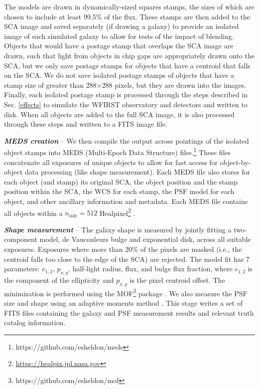\documentclass[aps,prd, amsmath,amssymb,superscriptaddress,showkeys,nofootinbib,reprint,preprintnumbers]{revtex4-1}
\begin{document}
The models are drawn in dynamically-sized squares stamps, the sizes of which are chosen to include at least 99.5\% of the flux.
These stamps are then added to the SCA image and saved separately (if drawing a galaxy) to provide an isolated image of each simulated galaxy to allow for tests of the impact of blending.
Objects that would have a postage stamp that overlaps the SCA image are drawn, such that light from objects in chip gaps are appropriately drawn onto the SCA, but we only save postage stamps for objects that have a centroid that falls on the SCA. 
We do not save isolated postage stamps of objects that have a stamp size of greater than 288$\times$288 pixels, but they are drawn into the images.
Finally, each isolated postage stamp is processed through the steps described in Sec. \ref{effects} to simulate the WFIRST observatory and detectors and written to disk. When all objects are added to the full SCA image, it is also processed through these steps and written to a FITS image file.

\textbf{\textit{MEDS creation}} -- We then compile the output across pointings of the isolated object stamps into MEDS (Multi-Epoch Data Structure) files.\footnote{https://github.com/esheldon/meds}
These files concatenate all exposures of unique objects to allow for fast access for object-by-object data processing (like shape measurement). 
Each MEDS file also stores for each object (and stamp) its original SCA, the object position and the stamp position within the SCA, the WCS for each stamp, the PSF model for each object, and other ancillary information and metadata.
Each MEDS file contains all objects within a $n_{\textrm{side}}=512$ Healpixel\footnote{\url{https://healpix.jpl.nasa.gov}} \cite{2005ApJ...622..759G,Zonca2019}.

\textbf{\textit{Shape measurement}} -- 
The galaxy shape is measured by jointly fitting a two-component model, de Vaucouleurs bulge and exponential disk, across all suitable exposures. 
Exposures where more than 20\% of the pixels are masked (i.e., the centroid falls too close to the edge of the SCA) are rejected. 
The model fit has 7 parameters: $e_{1,2}$, $p_{x,y}$, half-light radius, flux, and bulge flux fraction, where $e_{1,2}$ is the component of the ellipticity and $p_{x,y}$ is the pixel centroid offset. 
The minimization is performed using the \textsc{MOF}\footnote{https://github.com/esheldon/mof} package \cite{2014MNRAS.444L..25S}. 
We also measure the PSF size and shape using an adaptive moments method \cite{2003MNRAS.343..459H}. 
This stage writes a set of FITS files containing the galaxy and PSF measurement results and relevant truth catalog information.
\end{document}
